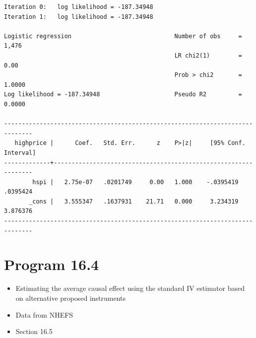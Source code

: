 \documentclass[
  10pt,
]{book}
\providecommand{\tightlist}{%
  \setlength{\itemsep}{0pt}\setlength{\parskip}{0pt}}
\begin{document}
\begin{verbatim}
Iteration 0:   log likelihood = -187.34948  
Iteration 1:   log likelihood = -187.34948  

Logistic regression                             Number of obs     =      1,476
                                                LR chi2(1)        =       0.00
                                                Prob > chi2       =     1.0000
Log likelihood = -187.34948                     Pseudo R2         =     0.0000

------------------------------------------------------------------------------
   highprice |      Coef.   Std. Err.      z    P>|z|     [95% Conf. Interval]
-------------+----------------------------------------------------------------
        hspi |   2.75e-07   .0201749     0.00   1.000    -.0395419    .0395424
       _cons |   3.555347   .1637931    21.71   0.000     3.234319    3.876376
------------------------------------------------------------------------------
\end{verbatim}

\hypertarget{program-16.4}{%
\section{Program 16.4}\label{program-16.4}}

\begin{itemize}
\tightlist
\item
  Estimating the average causal effect using the standard IV estimator based on alternative proposed instruments
\item
  Data from NHEFS
\item
  Section 16.5
\end{itemize}
\end{document}
